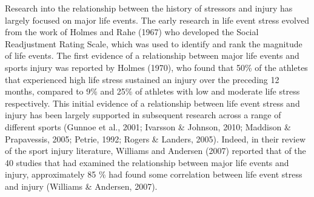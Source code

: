 \documentclass[man,floatsintext]{apa6}
\begin{document}
Research into the relationship between the history of stressors and injury has largely focused on major life events.
The early research in life event stress evolved from the work of Holmes and Rahe (1967) who developed the Social Readjustment Rating Scale, which was used to identify and rank the magnitude of life events.
The first evidence of a relationship between major life events and sports injury was reported by Holmes (1970),
who found that 50\% of the athletes that experienced high life stress sustained an injury over the preceding 12 months, compared to 9\% and 25\% of athletes with low and moderate life stress respectively.
This initial evidence of a relationship between life event stress and injury has been largely supported in subsequent research across a range of different sports (Gunnoe et al., 2001; Ivarsson \& Johnson, 2010; Maddison \& Prapavessis, 2005; Petrie, 1992; Rogers \& Landers, 2005).
Indeed, in their review of the sport injury literature, Williams and Andersen (2007) reported that of the 40 studies that had examined the relationship between major life events and injury, approximately 85 \% had found some correlation between life event stress and injury (Williams \& Andersen, 2007).
\end{document}
